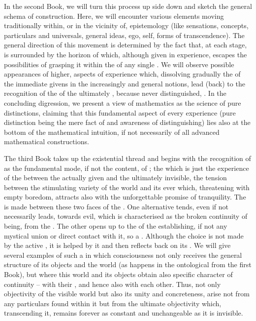In the second Book, we will turn this process up side down and sketch the
general schema of  construction.  Here, we will encounter
various elements moving traditionally within, or in the vicinity of,
epistemology (like sensations, concepts, particulars and universals, general
ideas, ego, self, forms of transcendence).  The general direction of this
movement is determined by the fact that, at each stage,  is
surrounded by the horizon of  which, although given in
experience, escapes the possibilities of grasping it within the 
of any single . We will observe possible  appearances of
higher,  aspects of experience which, dissolving gradually the
 of the immediate givens in the increasingly  and
general notions, lead (back) to the recognition of the  of the
ultimately , because never distinguished, .
In the concluding digression, we present a view of mathematics as the science of
pure distinctions, claiming that this fundamental aspect of every experience
(pure distinction being the mere fact of and awareness of distinguishing) lies
also at the bottom of the mathematical intuition, if not necessarily of all
advanced mathematical constructions.

The third Book takes up the existential thread and begins with the recognition
of  as the fundamental mode, if not the content, of ; the  which is just the experience of the
 between the actually given and the ultimately invisible, the
tension between the stimulating variety of the  world and its ever
 which, threatening with empty boredom, attracts also with
the unforgettable promise of tranquility. The  is made
between these two faces of the . One alternative tends, even if not
necessarily leads, towards evil, which is characterised as the broken continuity
of being,  from the . The other opens up to the
 of the  establishing, if not any mystical union or direct
contact with it, so a .  Although the choice is not
made by the active , it is helped by it and then reflects back
on its . We will give several examples of such a  in which  consciousness not only receives the general
structure of its objects and the world (as happens in the ontological
 from the first Book), but where this world and its
objects obtain also specific character of  continuity -- with
their , and hence also with each other. Thus, not only objectivity
of the visible world but also its unity and concreteness, arise not from any
particulars found within it but from the ultimate objectivity which,
transcending it, remains forever as constant and unchangeable as it is
invisible.


